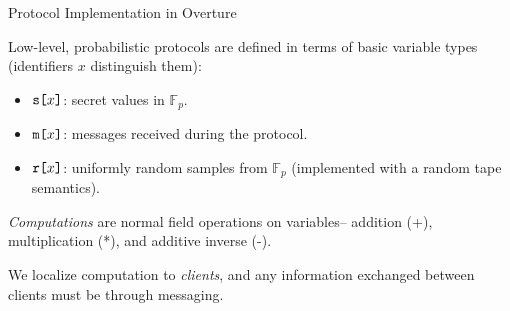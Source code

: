 \documentclass{beamer}
\begin{document}
\begin{frame}{Protocol Implementation in Overture}

  Low-level, probabilistic protocols are defined in terms of basic variable types
  (identifiers $x$ distinguish them):
  \begin{itemize}
  \item $\texttt{s[}x\texttt{]}$: secret values in $\mathbb{F}_p$.
  \item $\texttt{m[}x\texttt{]}$: messages received during the protocol.
  \item $\texttt{r[}x\texttt{]}$: uniformly random samples from $\mathbb{F}_p$ (implemented with
    a random tape semantics).
  \end{itemize}
  \emph{Computations} are normal field operations on variables-- addition (+), multiplication (*),
  and additive inverse (-).

  \medskip
  
  We localize computation to \emph{clients}, and any information
  exchanged between clients must be through messaging.
\end{frame}
\end{document}
